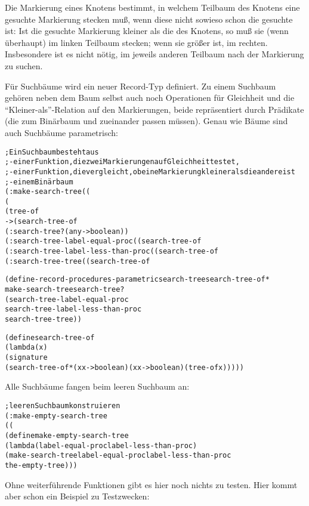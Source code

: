 Die Markierung eines Knotens bestimmt,
in welchem Teilbaum
des Knotens eine gesuchte Markierung stecken muß, wenn diese nicht sowieso schon die gesuchte ist: Ist die gesuchte
Markierung kleiner als die des Knotens, so muß sie (wenn überhaupt) im
linken Teilbaum stecken; wenn sie größer ist, im rechten.
Insbesondere ist es nicht nötig, im jeweils anderen Teilbaum nach der
Markierung zu suchen.

Für Suchbäume wird ein neuer Record-Typ
definiert. Zu einem Suchbaum
gehören neben dem Baum selbst auch noch Operationen für
Gleichheit und die "`Kleiner-als"'-Relation auf den Markierungen, beide repräsentiert durch
Prädikate (die zum Binärbaum und zueinander passen müssen).  Genau wie
Bäume sind auch Suchbäume parametrisch:
%
\begin{alltt}
; Ein Suchbaum besteht aus
; - einer Funktion, die zwei Markierungen auf Gleichheit testet,
; - einer Funktion, die vergleicht, ob eine Markierung kleiner als die andere ist
; - einem Binärbaum
(: make-search-tree ((%a %a -> boolean) 
                     (%a %a -> boolean) 
                     (tree-of %a) 
                         -> (search-tree-of %a)))
(: search-tree? (any -> boolean))
(: search-tree-label-equal-proc ((search-tree-of %a) -> (%a %a -> boolean)))
(: search-tree-label-less-than-proc ((search-tree-of %a) -> (%a %a -> boolean)))
(: search-tree-tree ((search-tree-of %a) -> (tree-of %a)))

(define-record-procedures-parametric search-tree search-tree-of*
  make-search-tree search-tree?
  (search-tree-label-equal-proc
   search-tree-label-less-than-proc
   search-tree-tree))

(define search-tree-of
  (lambda (x)
    (signature
     (search-tree-of* (x x -> boolean) (x x -> boolean) (tree-of x)))))
\end{alltt}
%
Alle Suchbäume fangen
beim leeren Suchbaum an:
%
\begin{alltt}
; leeren Suchbaum konstruieren
(: make-empty-search-tree
   ((%a %a -> boolean) (%a %a -> boolean) -> (search-tree-of %a)))
(define make-empty-search-tree
  (lambda (label-equal-proc label-less-than-proc)
    (make-search-tree label-equal-proc label-less-than-proc
                      the-empty-tree)))
\end{alltt}
%
Ohne weiterführende Funktionen gibt es hier noch nichts zu testen. Hier kommt
aber schon ein Beispiel zu Testzwecken:

